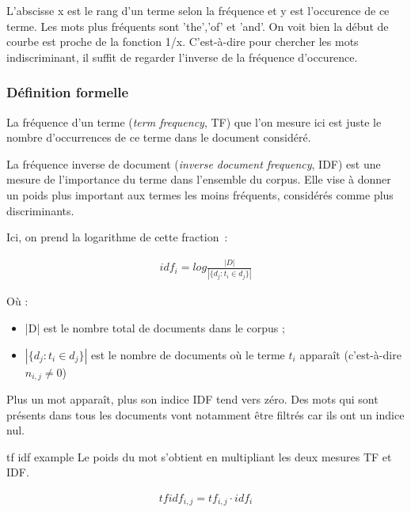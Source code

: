 \documentclass[a4paper, 12pt]{article}
\begin{document}
L'abscisse x est le rang d'un terme selon la fréquence et y est l'occurence de ce terme. Les mots plus fréquents sont 'the','of' et 'and'. On voit bien la début de courbe est proche de la fonction 1/x. C'est-à-dire pour chercher les mots indiscriminant, il suffit de regarder l'inverse de la fréquence d'occurence.

\subsubsection{Définition formelle}

\begin{definition}[TF]
 La fréquence d'un terme (\textit{term frequency}, TF) que l'on mesure ici est juste le nombre d'occurrences de ce terme dans le document considéré.
\end{definition}

\begin{definition}[IDF]
 La fréquence inverse de document (\textit{inverse document frequency}, IDF) est une mesure de l'importance du terme dans l'ensemble du corpus. Elle vise à donner un poids plus important aux termes les moins fréquents, considérés comme plus discriminants.
\end{definition}

Ici, on prend la logarithme de cette fraction~:

\begin{align}
 idf_{i} =  log \frac{|D|}{|\{d_{j}: t_{i} \in d_{j}\}|}
\end{align}

Où : 
\begin{itemize}
 \item |D| est le nombre total de documents dans le corpus ;
 \item $|\{d_{j} : t_{i} \in d_{j}\}|$ est le nombre de documents où le terme  $t_{i}$  apparaît (c'est-à-dire  $n_{i,j} \neq 0$)
\end{itemize}

Plus un mot apparaît, plus son indice IDF tend vers zéro. Des mots qui sont présents dans tous les documents vont notamment être filtrés car ils ont un indice nul.

\begin{definition}[TF-IDF]tf idf example
Le poids du mot s'obtient en multipliant les deux mesures TF et IDF.
\end{definition}

\begin{align}
 tfidf_{i,j} = tf_{i,j} \cdot  idf_{i}
\end{align}
\end{document}
